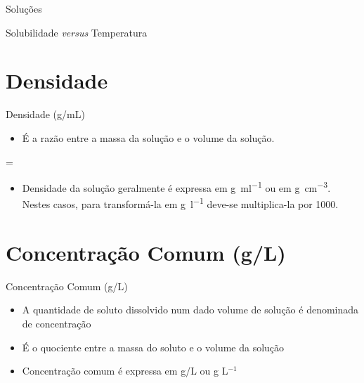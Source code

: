 \documentclass[presentation,professionalfonts,aspectratio=169]{beamer}
\begin{document}
\begin{frame}[label={sec:orgbd3cab3}]{Soluções}
\begin{description}
\begin{frame}[label={sec:org3015545}]{Solubilidade \emph{versus} Temperatura}
\section{Densidade}
\label{sec:org2e0bdef}

\begin{frame}[label={sec:org2e43eee}]{Densidade (g/mL)}
\begin{itemize}
\item É a razão entre a massa da solução e o volume da solução.
\end{itemize}

\begin{tcolorbox}
=
\end{tcolorbox}

\begin{itemize}
\item Densidade da solução geralmente é expressa em \unit{\gram\per\ml} ou em \unit{\gram\per\cubic\centi\metre}. Nestes casos, para transformá-la em \unit{\gram\per\litre} deve-se multiplica-la por 1000.
\end{itemize}
\end{frame}


\section{Concentração Comum (g/L)}
\label{sec:org2708fee}

\begin{frame}[label={sec:org4e4d2a1}]{Concentração Comum (g/L)}
\begin{itemize}
\item A quantidade de soluto dissolvido num dado volume de solução é denominada de concentração
\item É o quociente entre a massa do soluto e o volume da solução
\item Concentração comum é expressa em \alert{g/L} ou \alert{g L\(^{-1}\)}


\end{itemize}
\end{frame}
\end{frame}
\end{description}
\end{frame}
\end{document}
